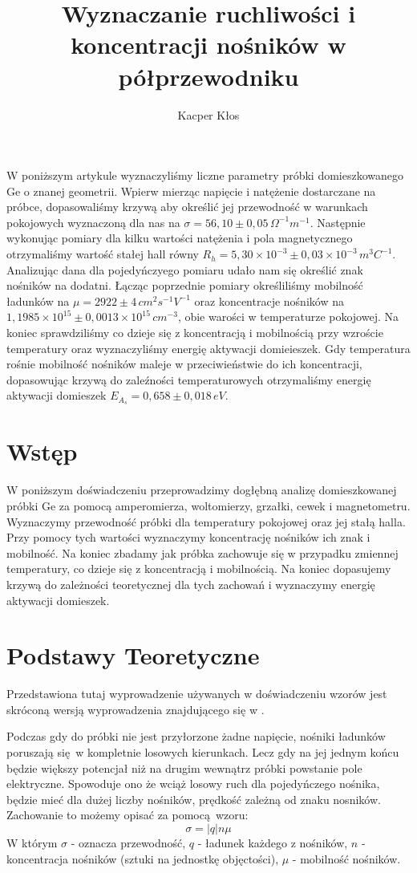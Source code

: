 \documentclass[12pt]{article}
\title{Wyznaczanie ruchliwości i koncentracji nośników w półprzewodniku}
\author{Kacper Kłos}
\begin{document}
\maketitle
W poniższym artykule wyznaczyliśmy liczne parametry próbki domieszkowanego Ge o znanej geometrii. Wpierw mierząc napięcie i natężenie dostarczane na próbce, dopasowaliśmy krzywą aby określić jej przewodność w warunkach pokojowych wyznaczoną dla nas na $\sigma = 56{,}10 \pm 0{,}05 \, \Omega^{-1}m^{-1}$. Następnie wykonując pomiary dla kilku wartości natężenia i pola magnetycznego otrzymaliśmy wartość stałej hall równy $R_h = 5{,}30\times 10^{-3} \pm 0{,}03\times 10^{-3} \, m^3 C^{-1}$. Analizując dana dla pojedyńczyego pomiaru udało nam się określić znak nośników na dodatni. Łącząc poprzednie pomiary określiliśmy mobilność ładunków na $\mu = 2922 \pm 4 \, cm^2s^{-1}V^{-1}$ oraz koncentracje nośników na $1{,}1985 \times 10^{15} \pm 0{,}0013 \times 10^{15} \, cm^{-3}$, obie warości w temperaturze pokojowej. Na koniec sprawdziliśmy co dzieje się z koncentracją i mobilnością przy wzroście temperatury oraz wyznaczyliśmy energię aktywacji domieieszek. Gdy temperatura rośnie mobilność nośników maleje w przeciwieństwie do ich koncentracji, dopasowując krzywą do zaleźności temperaturowych otrzymaliśmy energię aktywacji domieszek $E_{A_s} = 0{,}658 \pm 0{,}018 \, eV$.

\newpage
\section{Wstęp}
W poniższym doświadczeniu przeprowadzimy dogłębną analizę domieszkowanej próbki Ge za pomocą amperomierza, woltomierzy, grzałki, cewek i magnetometru. Wyznaczymy przewodność próbki dla temperatury pokojowej
oraz jej stałą halla. Przy pomocy tych wartości wyznaczymy koncentrację nośników ich znak i mobilność. Na koniec zbadamy jak próbka zachowuje się w przypadku zmiennej temperatury, co dzieje się z koncentracją i mobilnością.
Na koniec dopasujemy krzywą do zależności teoretycznej dla tych zachowań i wyznaczymy energię aktywacji domieszek.

\section{Podstawy Teoretyczne}
Przedstawiona tutaj wyprowadzenie używanych w doświadczeniu wzorów jest skróconą wersją wyprowadzenia znajdującego się w \cite{skrypt}.

Podczas gdy do próbki nie jest przyłorzone żadne napięcie, nośniki ładunków poruszają się w kompletnie losowych kierunkach.
Lecz gdy na jej jednym końcu będzie większy potencjał niż na drugim wewnątrz próbki powstanie pole elektryczne.
Spowoduje ono że wciąż losowy ruch dla pojedyńczego nośnika, będzie mieć dla dużej liczby nośników, prędkość zależną od znaku nosników.
Zachowanie to możemy opisać za pomocą wzoru:
\begin{equation}
    \sigma = |q|n\mu
    \label{eq:conductivity}
\end{equation}
W którym $\sigma$ - oznacza przewodność, $q$ - ładunek każdego z nośników, $n$ - koncentracja nośników (sztuki na jednostkę objęctości), $\mu$ - mobilność nośników.
\end{document}
